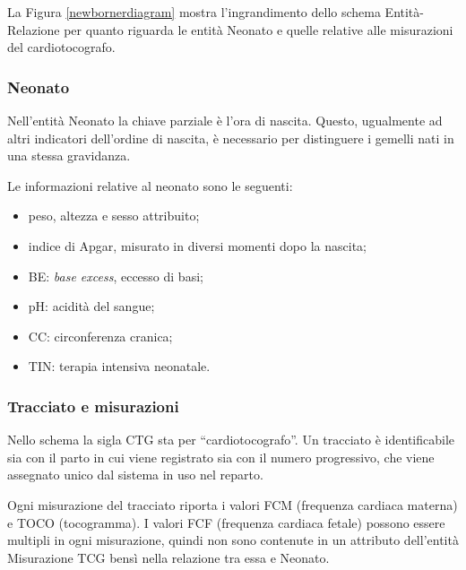 La Figura \ref{newbornerdiagram} mostra l'ingrandimento dello schema Entità-Relazione per quanto riguarda le entità Neonato e quelle relative alle misurazioni del cardiotocografo.

\subsubsection{Neonato}

Nell'entità Neonato la chiave parziale è l'ora di nascita.
Questo, ugualmente ad altri indicatori dell'ordine di nascita, è necessario per distinguere i gemelli nati in una stessa gravidanza.

Le informazioni relative al neonato sono le seguenti:
\begin{itemize}
\item peso, altezza e sesso attribuito;
\item indice di Apgar, misurato in diversi momenti dopo la nascita;
\item BE: \emph{base excess}, eccesso di basi;
\item pH: acidità del sangue;
\item CC: circonferenza cranica;
\item TIN: terapia intensiva neonatale.
\end{itemize}

\subsubsection{Tracciato e misurazioni}

Nello schema la sigla CTG sta per \enquote{cardiotocografo}.
Un tracciato è identificabile sia con il parto in cui viene registrato sia con il numero progressivo, che viene assegnato unico dal sistema in uso nel reparto.

Ogni misurazione del tracciato riporta i valori FCM (frequenza cardiaca materna) e TOCO (tocogramma).
I valori FCF (frequenza cardiaca fetale) possono essere multipli in ogni misurazione, quindi non sono contenute in un attributo dell'entità Misurazione TCG bensì nella relazione tra essa e Neonato.